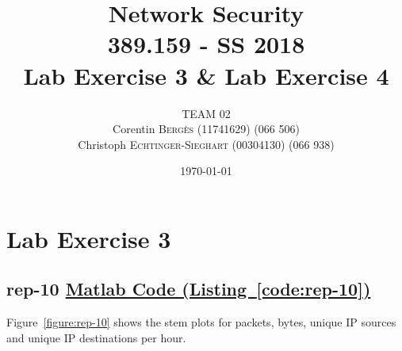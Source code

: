 \documentclass{article}
\title{Network Security \\ 389.159 - SS 2018 \\ Lab Exercise 3 \& Lab Exercise 4} %
\author{
    TEAM 02 \\
    Corentin \textsc{Bergès} (11741629) (066 506) \\
    Christoph \textsc{Echtinger-Sieghart} (00304130) (066 938)
}
\date{\today} %
\newcommand{\codelink}[1]{%
    \hyperref[#1]{\quad\faArrowCircleRight\enskip Matlab Code (Listing~\ref{#1})}%
}
\begin{document}
\maketitle %
\renewcommand{\arraystretch}{2} %


\section{Lab Exercise 3}

\subsection{rep-10 \codelink{code:rep-10}}

Figure~\ref{figure:rep-10} shows the stem plots for packets, bytes, unique IP sources and
unique IP destinations per hour.
\end{document}
